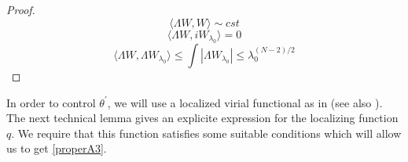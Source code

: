 \documentclass[a4paper,two-side,10pt]{amsart}
\numberwithin{equation}{section}
\begin{document}
\begin{proof}



$$\langle \Lambda W , W \rangle \sim cst$$
$$\langle  \Lambda W , i W_{\lambda_0} \rangle =0$$
$$\langle  \Lambda W , \Lambda W_{\lambda_0} \rangle \leq \int |\Lambda W_{\lambda_0}| \leq \lambda_0^{(N-2)/2} $$

\fi

\end{proof}




In order to control $\theta^\prime$, we will use a localized virial functional as in \cite{JJ} (see also \cite{raphael2011existence}). The next technical lemma gives an explicite expression for the localizing function $q$. We require that this function satisfies some suitable conditions which will allow us to get \eqref{properA3}.
\end{document}
